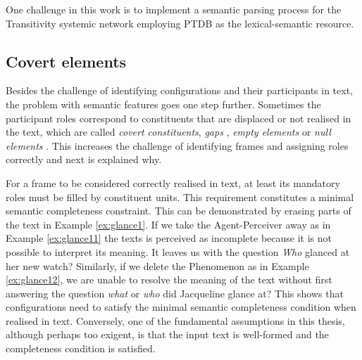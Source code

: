     
    One challenge in this work is to implement a semantic parsing process for the Transitivity systemic network employing PTDB as the lexical-semantic resource. 

\subsection{Covert elements}
    
    Besides the challenge of identifying configurations and their participants in text, the problem with semantic features goes one step further. Sometimes the participant roles correspond to constituents that are displaced or not realised in the text, which are called \textit{covert constituents}\citep[115,135,194]{Fawcett2008}, \textit{gaps} \citep{ross1967constraints}, \textit{empty elements} \citep[557--575]{muller2018grammatical} or \textit{null elements} \citep{Chomsky81, Chomsky1982, Chomsky1986}. This increases the challenge of identifying frames and assigning roles correctly and next is explained why. 
    
    For a frame to be considered correctly realised in text, at least its mandatory roles must be filled by constituent units. This requirement constitutes a minimal semantic completeness constraint. This can be demonstrated by erasing parts of the text in Example \ref{ex:glance1}. If we take the Agent-Perceiver away as in Example \ref{ex:glance11} the texts is perceived as incomplete because it is not possible to interpret its meaning. It leaves us with the question \textit{Who} glanced at her new watch? Similarly, if we delete the Phenomenon as in Example \ref{ex:glance12}, we are unable to resolve the meaning of the text without first answering the question \textit{what} or \textit{who} did Jacqueline glance at? This shows that  configurations need to satisfy the minimal semantic completeness condition when realised in text. Conversely, one of the fundamental assumptions in this thesis, although perhaps too exigent, is that the input text is well-formed and the completeness condition is satisfied.

